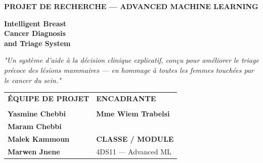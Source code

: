 \documentclass[11pt,a4paper]{report}
\begin{document}
\begin{titlepage}
\begin{minipage}{0.75\textwidth}
        {\selectfont\scriptsize\bfseries\color{accentPink} \MakeUppercase{Projet de Recherche — Advanced Machine Learning}} \\
        \vspace{0.3cm}

        {\fontsize{40}{48}\selectfont\bfseries\color{textDark} Intelligent Breast \\ Cancer Diagnosis \\ \textcolor{primaryPink}{and Triage System} \par}
        
        \vspace{1.5cm}
        
        \begin{tcolorbox}[
            colback=white,
            colframe=primaryPink,
            leftrule=3pt,
            rightrule=0pt,
            toprule=0pt,
            bottomrule=0pt,
            arc=0mm,
            boxsep=0pt,
            left=15pt,
            width=\linewidth,
            nobeforeafter
        ]
            \color{textGray}\small\itshape
            "Un système d'aide à la décision clinique explicatif, conçu pour améliorer le triage précoce des lésions mammaires — en hommage à toutes les femmes touchées par le cancer du sein."
        \end{tcolorbox}

        \vspace{4.5cm}

        \begin{tabular}{@{}p{} p{}@{}}
            {\scriptsize\bfseries\color{textGray} ÉQUIPE DE PROJET} & {\scriptsize\bfseries\color{textGray} ENCADRANTE} \\
            \vspace{0.1cm} & \vspace{0.1cm} \\
            \textbf{Yasmine Chebbi} & \textbf{Mme Wiem Trabelsi} \\
            \textbf{Maram Chebbi} & \\
            \textbf{Malek Kammoun} & {\scriptsize\bfseries\color{textGray} CLASSE / MODULE} \\
            \textbf{Marwen Jnene} & 4DS11 — Advanced ML
        \end{tabular}

    \end{minipage}
    
    
    \restoregeometry
\end{titlepage}
\end{document}
